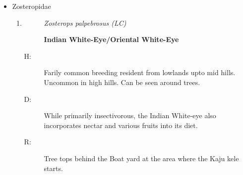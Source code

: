 \begin{itemize}
\begin{enumerate}
\end{enumerate}%
\item%
Zosteropidae%
\begin{enumerate}%
\item%
\begin{description}%
\item[]%
\textit{Zosterops palpebrosus (LC)}%
\item[]%
\textbf{Indian White{-}Eye/Oriental White{-}Eye}%
\end{description}%
\begin{description}%
\item[H: ]%
Farily common breeding resident from lowlands upto mid hills. Uncommon in high hills. Can be seen around trees.%
\item[D: ]%
While primarily insectivorous, the Indian White{-}eye also incorporates nectar and various fruits into its diet.%
\item[R: ]%
Tree tops behind the Boat yard at the area where the Kaju kele starts.%
\end{description}%
\end{enumerate}%
\end{itemize}